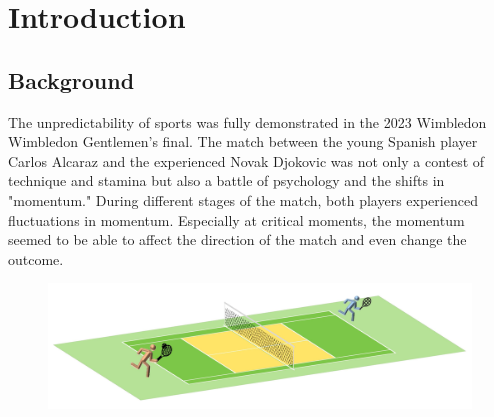 \documentclass[12pt]{article}%
\begin{document}
	\begin{center}
		\tableofcontents
	\end{center}		
	\newpage
	
	\section{Introduction}
	
	\subsection{Background}
The unpredictability of sports was fully demonstrated in the 2023 Wimbledon Wimbledon Gentlemen’s final. The match between the young Spanish player Carlos Alcaraz and the experienced Novak Djokovic was not only a contest of technique and stamina but also a battle of psychology and the shifts in "momentum." \cite{gollub2019producing} During different stages of the match, both players experienced fluctuations in momentum. Especially at critical moments, the momentum seemed to be able to affect \cite{sipko2015machine} the direction of the match and even change the outcome. \\

\begin{figure}[H]
	\centering
	\includegraphics[scale=0.35]{figure//pp.jpg}
	\label{pp}
\end{figure}



	
\end{document}
